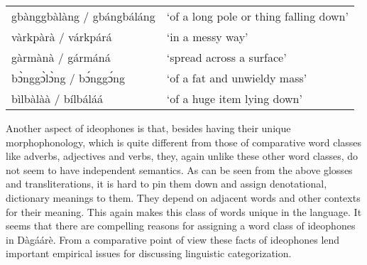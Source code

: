 \ea \label{ex:ideophones} {\begin{tabular}{ll}  
gbànggbàlàng / gbángbáláng  & ‘of a long pole or thing falling down’\\
vàrkpàrà / várkpárá& ‘in a messy way’\\
gàrmànà / gármáná & ‘spread across a surface’\\
bɔ̀nggɔ̀lɔ̀ng / bɔ́nggɔ́ng& ‘of a fat and unwieldy mass’\\
bìlbàlàà / bílbáláá& ‘of a huge item lying down’\\
\end{tabular}}\z


\ea\label{ex:ideophonesexx} 
\z\z

Another aspect of ideophones is that, besides having their unique morphophonology, which is
quite different from those of comparative word classes like adverbs, adjectives and verbs, they, again unlike these other word classes, do not seem to have independent semantics.
As can be seen from the above glosses and transliterations, it is hard to pin them down and
assign denotational, dictionary meanings to them. They depend on adjacent words and other
contexts for their meaning. This again makes this class of words unique in the language. It
seems that there are compelling reasons for assigning a word class of ideophones in
Dàgáárè. From a comparative point of view these facts of ideophones lend important
empirical issues for discussing linguistic categorization.

